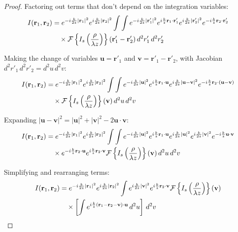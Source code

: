 \documentclass[a4paper,12pt]{article}
\begin{document}
\begin{proof}
Factoring out terms that don't depend on the integration variables:
\begin{align}
I(\mathbf{r}_1, \mathbf{r}_2) &= e^{-i\frac{k}{2z}|\mathbf{r}_1|^2} e^{i\frac{k}{2z}|\mathbf{r}_2|^2} \int\int e^{-i\frac{k}{2z}|\mathbf{r}'_1|^2} e^{i\frac{k}{z}\mathbf{r}_1 \cdot \mathbf{r}'_1} e^{i\frac{k}{2z}|\mathbf{r}'_2|^2} e^{-i\frac{k}{z}\mathbf{r}_2 \cdot \mathbf{r}'_2} \\
&\quad \times \mathcal{F}\left\{I_s\left(\frac{\mathbf{\rho}}{\lambda z}\right)\right\}(\mathbf{r}'_1 - \mathbf{r}'_2) \, d^2r'_1 \, d^2r'_2 \notag
\end{align}

Making the change of variables $\mathbf{u} = \mathbf{r}'_1$ and $\mathbf{v} = \mathbf{r}'_1 - \mathbf{r}'_2$, with Jacobian $d^2r'_1 \, d^2r'_2 = d^2u \, d^2v$:
\begin{align}
I(\mathbf{r}_1, \mathbf{r}_2) &= e^{-i\frac{k}{2z}|\mathbf{r}_1|^2} e^{i\frac{k}{2z}|\mathbf{r}_2|^2} \int\int e^{-i\frac{k}{2z}|\mathbf{u}|^2} e^{i\frac{k}{z}\mathbf{r}_1 \cdot \mathbf{u}} e^{i\frac{k}{2z}|\mathbf{u}-\mathbf{v}|^2} e^{-i\frac{k}{z}\mathbf{r}_2 \cdot (\mathbf{u}-\mathbf{v})} \\
&\quad \times \mathcal{F}\left\{I_s\left(\frac{\mathbf{\rho}}{\lambda z}\right)\right\}(\mathbf{v}) \, d^2u \, d^2v \notag
\end{align}

Expanding $|\mathbf{u}-\mathbf{v}|^2 = |\mathbf{u}|^2 + |\mathbf{v}|^2 - 2\mathbf{u} \cdot \mathbf{v}$:
\begin{align}
I(\mathbf{r}_1, \mathbf{r}_2) &= e^{-i\frac{k}{2z}|\mathbf{r}_1|^2} e^{i\frac{k}{2z}|\mathbf{r}_2|^2} \int\int e^{-i\frac{k}{2z}|\mathbf{u}|^2} e^{i\frac{k}{z}\mathbf{r}_1 \cdot \mathbf{u}} e^{i\frac{k}{2z}|\mathbf{u}|^2} e^{i\frac{k}{2z}|\mathbf{v}|^2} e^{-i\frac{k}{z}\mathbf{u} \cdot \mathbf{v}} \\
&\quad \times e^{-i\frac{k}{z}\mathbf{r}_2 \cdot \mathbf{u}} e^{i\frac{k}{z}\mathbf{r}_2 \cdot \mathbf{v}} \mathcal{F}\left\{I_s\left(\frac{\mathbf{\rho}}{\lambda z}\right)\right\}(\mathbf{v}) \, d^2u \, d^2v \notag
\end{align}

Simplifying and rearranging terms:
\begin{align}
I(\mathbf{r}_1, \mathbf{r}_2) &= e^{-i\frac{k}{2z}|\mathbf{r}_1|^2} e^{i\frac{k}{2z}|\mathbf{r}_2|^2} \int e^{i\frac{k}{2z}|\mathbf{v}|^2} e^{i\frac{k}{z}\mathbf{r}_2 \cdot \mathbf{v}} \mathcal{F}\left\{I_s\left(\frac{\mathbf{\rho}}{\lambda z}\right)\right\}(\mathbf{v}) \\
&\quad \times \left[\int e^{i\frac{k}{z}(\mathbf{r}_1-\mathbf{r}_2-\mathbf{v}) \cdot \mathbf{u}} \, d^2u \right] \, d^2v \notag
\end{align}


\end{proof}
\end{document}

